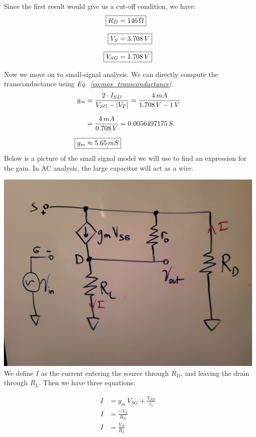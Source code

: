 \documentclass[12pt, fleqn]{article}
\begin{document}
\begin{enumerate}[label=(\alph*)]
    Since the first result would give us a cut-off condition, we have:
    \begin{align*}
        \Aboxed{R_D &= 146\,\Omega}\\[0.25cm]
        \Aboxed{V_S &= 3.708\,V}\\[0.25cm]
        \Aboxed{V_{SG} &= 1.708\,V}
    \end{align*}
    
    Now we move on to small-signal analysis.  We can directly compute the transconductance using \textit{Eq.~\ref{eq:mos_transconductance}}:
    \begin{align*}
        g_m &= \frac{2 \cdot I_{SD}}{V_{SG} - \left|V_T\right|} = \frac{4\,mA}{1.708\,V - 1\,V}\\[0.25cm]
        &= \frac{4\,mA}{0.708\,V} = 0.0056497175\,S\\[0.25cm]
        \Aboxed{g_m &\approx 5.65\,mS}
    \end{align*}
    \newpage\noindent
    Below is a picture of the small signal model we will use to find an expression for the gain.  In AC analysis, the large capacitor will act as a wire.
    
    \includegraphics[scale=0.1, center]{p1a.jpg}\\
    
    We define $I$ as the current entering the source through $R_D$, and leaving the drain through $R_L$.  Then we have three equations:
    
    \begin{align}
        I &= g_m\,V_{SG} + \frac{V_{SD}}{r_o}
        \label{eq:i1}\\[0.25cm]
        I &= \frac{-V_S}{R_D}
        \label{eq:i2}\\[0.25cm]
        I &= \frac{V_D}{R_L}
        \label{eq:i3}
    \end{align}
    

\end{enumerate}
\end{document}
